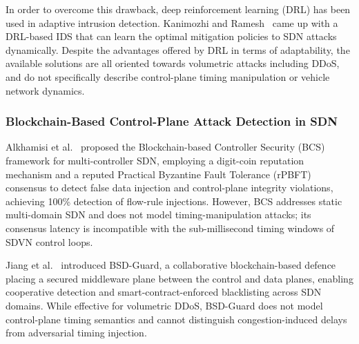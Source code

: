 In order to overcome this drawback, deep reinforcement learning (DRL) has been used in adaptive intrusion detection. Kanimozhi and Ramesh~\cite{Kanimozhi2022DRL} came up with a DRL-based IDS that can learn the optimal mitigation policies to SDN attacks dynamically. Despite the advantages offered by DRL in terms of adaptability, the available solutions are all oriented towards volumetric attacks including DDoS, and do not specifically describe control-plane timing manipulation or vehicle network dynamics.

\subsubsection{Blockchain-Based Control-Plane Attack Detection in SDN}
\label{sec:lit_bc_cp}
Alkhamisi et al.~\cite{alkhamisi2024bcs} proposed the Blockchain-based
Controller Security (BCS) framework for multi-controller SDN, employing a
digit-coin reputation mechanism and a reputed Practical Byzantine Fault
Tolerance (rPBFT) consensus to detect false data injection and control-plane
integrity violations, achieving 100\% detection of flow-rule injections.
However, BCS addresses static multi-domain SDN and does not model
timing-manipulation attacks; its consensus latency is incompatible with
the sub-millisecond timing windows of SDVN control loops.

Jiang et al.~\cite{jiang2022bsdguard} introduced BSD-Guard, a collaborative
blockchain-based defence placing a secured middleware plane between the control
and data planes, enabling cooperative detection and smart-contract-enforced
blacklisting across SDN domains. While effective for volumetric DDoS,
BSD-Guard does not model control-plane timing semantics and cannot distinguish
congestion-induced delays from adversarial timing injection.

